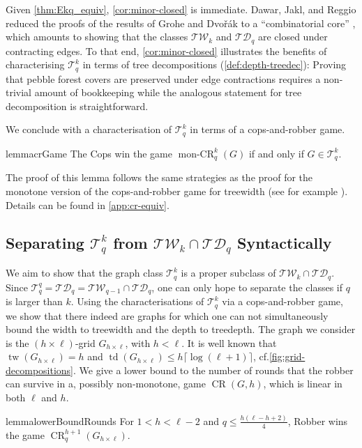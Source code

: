 \documentclass[a4paper,UKenglish,cleveref, autoref, thm-restate]{lipics-v2021}
\newcommand{\TW}{\ensuremath{\mathcal{TW}}}
\newcommand{\TD}{\ensuremath{\mathcal{TD}}}
\newcommand{\Ekq}{\ensuremath{\mathcal{T}_{q}^{k}}}
\newcommand{\EParam}[2]{\ensuremath{\mathcal{T}_{#2}^{#1}}}
\DeclareMathOperator{\CR}{CR}
\DeclareMathOperator{\monCR}{mon-CR}
\DeclareMathOperator{\tw}{tw}
\DeclareMathOperator{\td}{td}
\newcommand{\grid}[2]{\ensuremath{G_{#1 \times #2}}}
\begin{document}
Given \cref{thm:Ekq_equiv}, \cref{cor:minor-closed} is immediate.
Dawar, Jakl, and Reggio reduced the proofs of the results of Grohe and Dvo\v{r}\'ak \cite{grohe_counting_2020,dvorak_recognizing_2010} to a ``combinatorial core'' \cite[Remark~17]{dawar_lovasz-type_2021}, which amounts to showing that the classes $\mathcal{TW}_k$ and $\mathcal{TD}_q$ are closed under contracting edges.
To that end, \cref{cor:minor-closed} illustrates the benefits of characterising $\Ekq$ in terms of tree decompositions (\cref{def:depth-treedec}): Proving that pebble forest covers are preserved under edge contractions requires a non-trivial amount of bookkeeping while the analogous statement for tree decomposition is straightforward.



We conclude with a characterisation of $\Ekq$ in terms of a cops-and-robber game.

\begin{restatable}{lemma}{crGame}
	\label{lem:Ekq-cops}
	The Cops win the game $\monCR_q^{k}(G)$ if and only if $G\in \Ekq$.
\end{restatable}

The proof of this lemma follows the same strategies as the proof for the monotone version of the cops-and-robber game for treewidth (see for example \cite{Rabinovich14}). Details can be found in \cref{app:cr-equiv}.

\subsection{Separating $\Ekq$ from $\mathcal{TW}_k \cap \mathcal{TD}_q$ Syntactically}

We aim to show that the graph class $\Ekq$ is a proper subclass of $\mathcal{TW}_k \cap \mathcal{TD}_q$.
Since $\EParam{q}{q}=\TD_q=\TW_{q-1}\cap\TD_q$, one can only hope to separate the classes if $q$ is larger than $k$.
Using the characterisations of $\Ekq$ via a cops-and-robber game, we show that there indeed are graphs for which one can not simultaneously bound the width to treewidth and the depth to treedepth.
The graph we consider is the $(h\times\ell)$-grid \grid{h}{\ell}, with $h<\ell$. It is well known that $\tw(\grid{h}{\ell})=h$ and $\td(\grid{h}{\ell})\leq h \lceil\log(\ell+1)\rceil$, cf.\@ \cref{fig:grid-decompositions}. We give a lower bound to the number of rounds that the robber can survive in a, possibly non-monotone, game $\CR(G,h)$, which is linear in both $\ell$ and $h$.

\begin{restatable}{lemma}{lowerBoundRounds}
	\label{lem:lower-bound-rounds}
	For $1<h<\ell-2$ and $q\leq\frac{h(\ell  - h + 2)}{4}$, Robber wins the game $\CR_q^{h+1}(\grid{h}{\ell})$.
\end{restatable}
\end{document}
